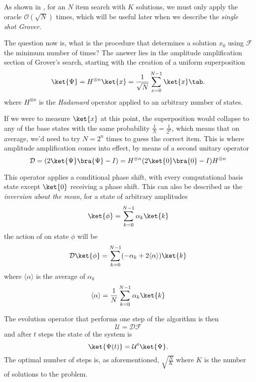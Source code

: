 	As shown in \cite{BBHT96}, for an $N$ item search with $K$ solutions, we must only apply the oracle $\mathcal{O}(\sqrt{N})$ times, which will be useful later when we describe the \textit{single shot Grover}.\par
	The question now is, what is the procedure that determines a solution $x_0$ using $\mathcal{F}$ the minimum number of times? The answer lies in the amplitude amplification section of Grover's search, starting with the creation of a uniform superposition
	\begin{equation}
		\ket{\Psi} = H^{\otimes n}\ket{x} = \frac{1}{\sqrt{N}}\sum_{x=0}^{N-1} \ket{x}\tab.
	\end{equation}
	where $H^{\otimes n}$ is the \textit{Hadamard} operator applied to an arbitrary number of states.\par
	If we were to measure $\ket{x}$ at this point, the superposition would collapse to any of the base states with the same probability $\frac{1}{N} = \frac{1}{2^n}$, which means that on average, we'd need to try $N = 2^n$ times to guess the correct item. 
	This is where amplitude amplification comes into effect, by means of a second unitary operator
	\begin{equation}
		\mathcal{D} = (2\ket{\Psi}\bra{\Psi} - I) = H^{\otimes n}(2\ket{0}\bra{0} - I)H^{\otimes n}   
	\end{equation}

	This operator applies a conditional phase shift, with every computational basis state except $\ket{0}$ receiving a phase shift. This can also be described as the \textit{inversion about the mean}, for a state of arbitrary amplitudes
	\begin{equation}
		\ket{\phi} = \sum_{k=0}^{N-1} \alpha_k\ket{k}
	\end{equation}
	the action of  on state $\phi$ will be
	\begin{equation}
		\mathcal{D}\ket{\phi} = \sum_{k=0}^{N-1}(-\alpha_k + 2\langle \alpha \rangle)\ket{k}
	\end{equation}
	where $\langle \alpha \rangle$ is the average of $\alpha_k$
	\begin{equation}
		\langle \alpha \rangle = \frac{1}{N} \sum_{k=0}^{N-1} \alpha_k\ket{k}
	\end{equation}
	\par
	The evolution operator that performs one step of the algorithm is then
	\begin{equation}
		\mathcal{U} = \mathcal{D}\mathcal{F}
	\end{equation}
	and after $t$ steps the state of the system is
	\begin{equation}
		\ket{\Psi(t)} = \mathcal{U}^t\ket{\Psi}.
	\end{equation}
	The optimal number of steps is, as aforementioned, $\sqrt{\frac{N}{K}}$ where $K$ is the number of solutions to the problem.
